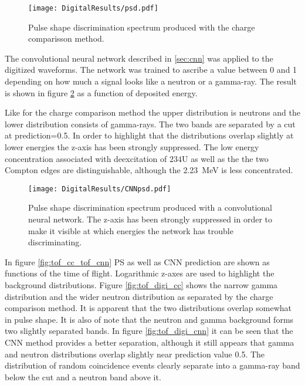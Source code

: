\documentclass[main.tex]{subfiles}
\begin{document}
\begin{figure}[ht]
    \centering
        \texttt{[image: DigitalResults/psd.pdf]}
        \caption[PSD spectrum, digital setup.]{Pulse shape discrimination spectrum produced with the charge comparisson method.}
        \label{fig:psd_d}
\end{figure}

The convolutional neural network described in \ref{sec:cnn} was applied to the digitized waveforms. The network was trained to ascribe a value between 0 and 1 depending on how much a signal looks like a neutron or a gamma-ray. The result is shown in figure \ref{fig:cnn_E} as a function of deposited energy. 

Like for the charge comparison method the upper distribution is neutrons and the lower distribution consists of gamma-rays. The two bands are separated by a cut at prediction=0.5. In order to highlight that the distributions overlap slightly at lower energies the z-axis has been strongly suppressed. The low energy concentration associated with deexcitation of $\text{234}$U as well as the the two Compton edges are distinguishable, although the \SI{2.23}{\MeV} is less concentrated.

\begin{figure}[ht]
    \centering
        \texttt{[image: DigitalResults/CNNpsd.pdf]}
        \caption[PSD spectrum obtained with CNN]{Pulse shape discrimination spectrum produced with a convolutional neural network. The z-axis has been strongly suppressed in order to make it visible at which energies the network has trouble discriminating.}
    \label{fig:cnn_E} 
\end{figure}

In figure \ref{fig:tof_cc_tof_cnn} PS as well as CNN prediction are shown as functions of the time of flight. Logarithmic z-axes are used to highlight the background distributions. Figure \ref{fig:tof_digi_cc} shows the narrow gamma distribution and the wider neutron distribution as separated by the charge comparison method. It is apparent that the two distributions overlap somewhat in pulse shape. It is also of note that the neutron and gamma background forms two slightly separated bands.  In figure \ref{fig:tof_digi_cnn} it can be seen that the CNN method provides a better separation, although it still appears that gamma and neutron distributions overlap slightly near prediction value 0.5. The distribution of random coincidence events clearly separate into a gamma-ray band below the cut and a neutron band above it.
\end{document}
